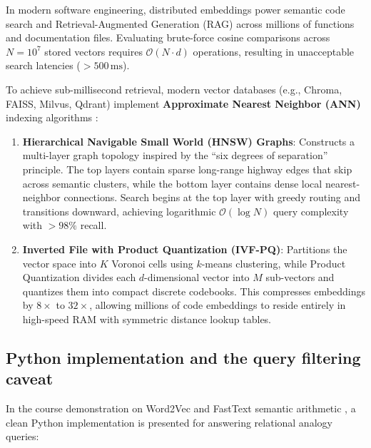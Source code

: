 \documentclass[../../main.tex]{subfiles}
\begin{document}
In modern software engineering, distributed embeddings power semantic code search and Retrieval-Augmented Generation (RAG) across millions of functions and documentation files. Evaluating brute-force cosine comparisons across $N = 10^7$ stored vectors requires $\mathcal{O}(N \cdot d)$ operations, resulting in unacceptable search latencies ($>500\,\text{ms}$).

To achieve sub-millisecond retrieval, modern vector databases (e.g., Chroma, FAISS, Milvus, Qdrant) implement \textbf{Approximate Nearest Neighbor (ANN)} indexing algorithms \cite{enkk2023embeddings}:
\begin{enumerate}
    \item \textbf{Hierarchical Navigable Small World (HNSW) Graphs}: Constructs a multi-layer graph topology inspired by the ``six degrees of separation'' principle. The top layers contain sparse long-range highway edges that skip across semantic clusters, while the bottom layer contains dense local nearest-neighbor connections. Search begins at the top layer with greedy routing and transitions downward, achieving logarithmic $\mathcal{O}(\log N)$ query complexity with $>98\%$ recall.
    \item \textbf{Inverted File with Product Quantization (IVF-PQ)}: Partitions the vector space into $K$ Voronoi cells using $k$-means clustering, while Product Quantization divides each $d$-dimensional vector into $M$ sub-vectors and quantizes them into compact discrete codebooks. This compresses embeddings by $8\times$ to $32\times$, allowing millions of code embeddings to reside entirely in high-speed RAM with symmetric distance lookup tables.
\end{enumerate}

\subsection{Python implementation and the query filtering caveat}
\label{subsec:python_gist}

In the course demonstration on Word2Vec and FastText semantic arithmetic \cite{giobergia2024gist}, a clean Python implementation is presented for answering relational analogy queries:
\end{document}

